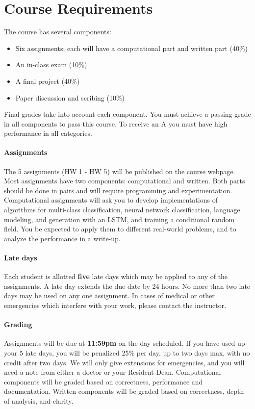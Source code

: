 \documentclass[11pt]{article}
\begin{document}
\vspace {0.25cm}
\section{Course Requirements}

The course has several components:

\begin{itemize}
\item Six assignments; each will have a computational part and written part (40\%)
\item An in-class exam (10\%)
\item A final project  (40\%)
\item Paper discussion and scribing (10\%)
\end{itemize}


\noindent Final grades take into account each component. You must
achieve a passing grade in all components to pass this course. To
receive an A you must have high performance in all categories.

\paragraph{Assignments}

The 5 assignments (HW 1 - HW 5) will be published on the course
webpage. Most assignments have two components: computational and
written. Both parts should be done in pairs
and will require programming and experimentation. Computational assignments will ask you to develop
implementations of algorithms for multi-class classification, neural
network classification, language modeling, and generation with an
LSTM, and training a conditional random field. You be expected to
apply them to different real-world problems, and to analyze the
performance in a write-up.

\paragraph{Late days} Each student is allotted \textbf{five} late days
which may be applied to any of the assignments.  A late day extends the
due date by 24 hours. No more than two late days may be used on any
one assignment. In cases of medical or other emergencies which
interfere with your work, please contact the
instructor.

\paragraph{Grading} Assignments will be due at \textbf{11:59pm} on the day
scheduled. If you have used up your 5 late days, you will be penalized
25\% per day, up to two days max, with no credit after two days. We
will only give extensions for emergencies, and you will need a note
from either a doctor or your Resident Dean. Computational components
will be graded based on correctness, performance and documentation.
Written components will be graded based on correctness, depth of
analysis, and clarity.
\end{document}
